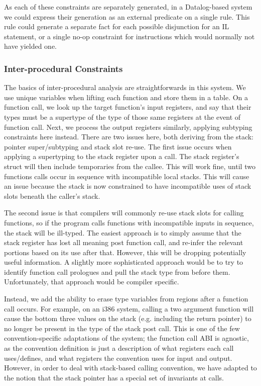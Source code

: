 As each of these constraints are separately generated, in a Datalog-based system we could express their generation as an external predicate on a single rule.
This rule could generate a separate fact for each possible disjunction for an IL statement, or a single no-op constraint for instructions which would normally not have yielded one.

\subsubsection{Inter-procedural Constraints}
The basics of inter-procedural analysis are straightforwards in this system. We use unique variables when lifting each function and store them in a table. On a function call, we look up the target function's input registers, and say that their types must be a supertype of the type of those same registers at the event of function call. Next, we process the output registers similarly, applying subtyping constraints here instead. There are two issues here, both deriving from the stack: pointer super/subtyping and stack slot re-use. The first issue occurs when applying a supertyping to the stack register upon a call. The stack register's struct will then include temporaries from the callee.
This will work fine, until two functions calls occur in sequence with incompatible local stacks.
This will cause an issue because the stack is now constrained to have incompatible uses of stack slots beneath the caller's stack.

The second issue is that compilers will commonly re-use stack slots for calling functions, so if the program calls functions with incompatible inputs in sequence, the stack will be ill-typed. The easiest approach is to simply assume that the stack register has lost all meaning post function call, and re-infer the relevant portions based on its use after that. However, this will be dropping potentially useful information. A slightly more sophisticated approach would be to try to identify function call prologues and pull the stack type from before them. Unfortunately, that approach would be compiler specific.

Instead, we add the ability to erase type variables from regions after a function call occurs. For example, on an i386 system, calling a two argument function will cause the bottom three values on the stack (e.g. including the return pointer) to no longer be present in the type of the stack post call. This is one of the few convention-specific adaptations of the system; the function call ABI is agnostic, as the convention definition is just a description of what registers each call uses/defines, and what registers the convention uses for input and output. However, in order to deal with stack-based calling convention, we have adapted to the notion that the stack pointer has a special set of invariants at calls.


